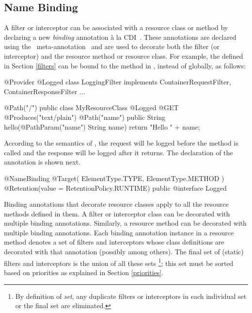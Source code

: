 \subsection{Name Binding}
\label{Name_Binding}

A filter or interceptor can be associated with a resource class or method by declaring a new \emph{binding} annotation \`{a} la CDI~\cite{jsr299}. These annotations are declared using the \jaxrs\ meta-annotation \NameBinding\ and are used to decorate both the filter (or interceptor) and the resource method or resource class. For example, the  defined in Section \ref{filters} can be bound to the method  in , instead of globally, as follows:

\begin{listing}{1}
@Provider
@Logged
class LoggingFilter implements ContainerRequestFilter, 
                               ContainerResponseFilter {
    ...
}
\end{listing}

\begin{listing}{1}
@Path("/")
public class MyResourceClass {
    @Logged
    @GET
    @Produces("text/plain")
    @Path("{name}")
    public String hello(@PathParam("name") String name) {
        return "Hello " + name;
    }
}
\end{listing}

According to the semantics of , the request will be logged before the  method is called and the response will be logged after it returns. The declaration of the  annotation is shown next.

\begin{listing}{1}
@NameBinding
@Target({ ElementType.TYPE, ElementType.METHOD })
@Retention(value = RetentionPolicy.RUNTIME)
public @interface Logged { }
\end{listing}

Binding annotations that decorate resource classes apply to all the resource methods defined in them. A filter or interceptor class can be decorated with multiple binding annotations. Similarly, a resource method can be decorated with multiple binding annotations.  Each binding annotation instance in a resource method denotes a set of filters and interceptors whose class definitions are decorated with that annotation (possibly among others). The final set of (static) filters and interceptors is the union of all these sets \footnote{By definition of {\em set}, any duplicate filters or interceptors in each individual set or the final set are eliminated.}; this set must be sorted based on priorities as explained in Section \ref{priorities}. 

